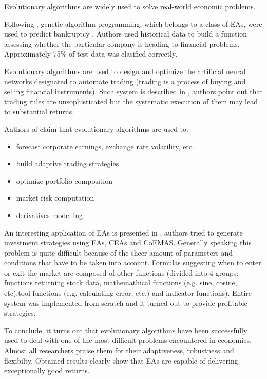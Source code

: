 Evolutionary algorithms are widely used to solve real-world economic problems.

Following \cite{EA-bankruptcy}, genetic algorithm programming, which belongs to a class of EAs, were used to predict bankruptcy .
Authors used historical data to build a function assessing whether the particular company is heading to financial problems.
Approximately 75\% of test data was clasified correctly.

Evolutionary algorithms are used to design and optimize the artificial neural networks designated to automate trading (trading is a process of buying and
 selling financial instruments).
Such system is described in \cite{trading}, authors point out that trading rules are unsophisticated but the systematic execution of them may lead to substantial 
returns.

Authors of \cite{intro_to_finance} claim that evolutionary algorithms are used to: 

\begin{itemize}
  \item forecast corporate earnings, exchange rate volatility, etc.
  \item build adaptive trading strategies
  \item optimize portfolio composition
  \item market risk computation
  \item derivatives modelling
\end{itemize}

An interesting application of EAs is presented in \cite{Dre_Sep}, authors tried to generate investment strategies using EAs, CEAs and CoEMAS.
Generally speaking this problem is quite difficult because of the sheer amount of parameters and conditions that have to be taken into account.
Formulas suggesting when to enter or exit the market are composed of other functions (divided into 4 groups: functions returning stock data, mathemathical functions
(e.g. sine, cosine, etc),tool functions (e.g. calculating error, etc.) and indicator functions).  
Entire system was implemented from scratch and it turned out to provide profitable strategies. 

To conclude, it turns out that evolutionary algorithms have been successfully used to deal with one of the most difficult problems encountered in economics.
Almost all researchers praise them for their adaptiveness, robustness and flexibilty.
Obtained results clearly show that EAs are capable of delivering exceptionally good returns.      

